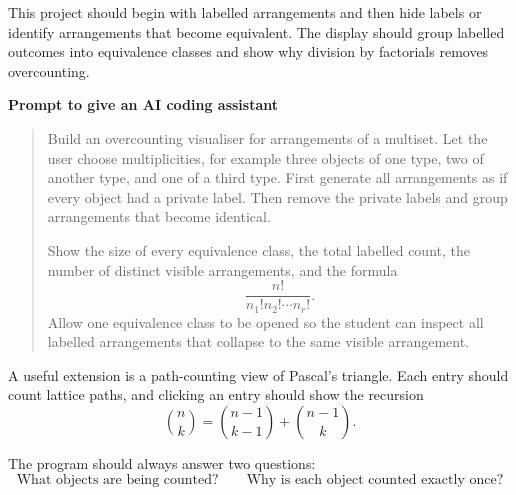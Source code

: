 This project should begin with labelled arrangements and then hide labels or identify arrangements that become equivalent. The display should group labelled outcomes into equivalence classes and show why division by factorials removes overcounting.

\begin{examplebox}
\textbf{Prompt to give an AI coding assistant}

\begin{quote}\small
Build an overcounting visualiser for arrangements of a multiset. Let the user choose multiplicities, for example three objects of one type, two of another type, and one of a third type. First generate all arrangements as if every object had a private label. Then remove the private labels and group arrangements that become identical.

Show the size of every equivalence class, the total labelled count, the number of distinct visible arrangements, and the formula
\[
\frac{n!}{n_1!n_2!\cdots n_r!}.
\]
Allow one equivalence class to be opened so the student can inspect all labelled arrangements that collapse to the same visible arrangement.
\end{quote}
\end{examplebox}

A useful extension is a path-counting view of Pascal's triangle. Each entry should count lattice paths, and clicking an entry should show the recursion
\[
\binom nk=\binom{n-1}{k-1}+\binom{n-1}{k}.
\]

\begin{summarybox}
The program should always answer two questions:
\[
\text{What objects are being counted?}
\qquad
\text{Why is each object counted exactly once?}
\]
\end{summarybox}
